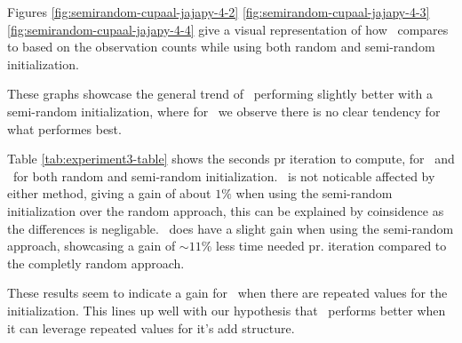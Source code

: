 Figures \autoref{fig:semirandom-cupaal-jajapy-4-2} \autoref{fig:semirandom-cupaal-jajapy-4-3} \autoref{fig:semirandom-cupaal-jajapy-4-4} give a visual representation of how \Cupaal\ compares to \Jajapy based on the observation counts while using both random and semi-random initialization.

These graphs showcase the general trend of \Cupaal\ performing slightly better with a semi-random initialization, where for \Jajapy\ we observe there is no clear tendency for what performes best.

Table \autoref{tab:experiment3-table} shows the seconds pr iteration to compute, for \Cupaal\ and \Jajapy\ for both random and semi-random initialization.
\Jajapy\ is not noticable affected by either method, giving a gain of about $1\%$ when using the semi-random initialization over the random approach, this can be explained by coinsidence as the differences is negligable.
\Cupaal\ does have a slight gain when using the semi-random approach, showcasing a gain of $\sim 11\%$ less time needed pr. iteration compared to the completly random approach.

These results seem to indicate a gain for \Cupaal\ when there are repeated values for the initialization.
This lines up well with our hypothesis that \Cupaal\ performs better when it can leverage repeated values for it's \gls{add} structure.
